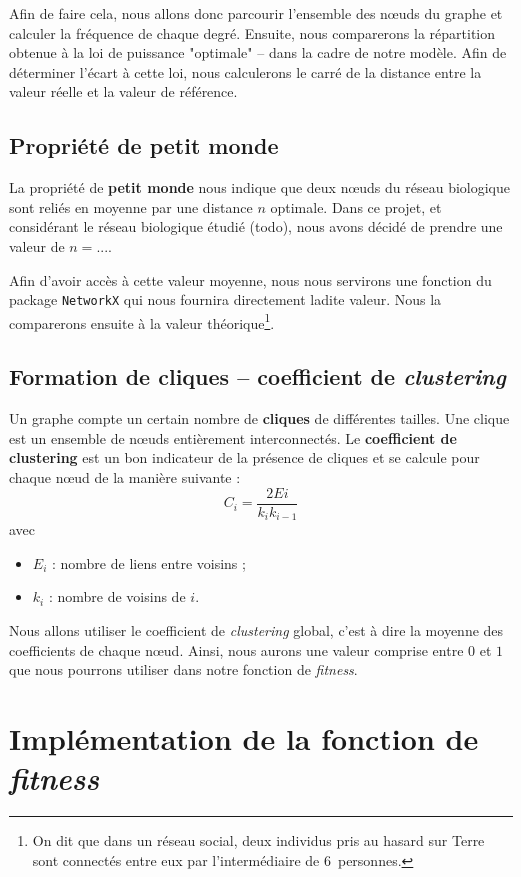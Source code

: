 Afin de faire cela, nous allons donc parcourir l'ensemble des nœuds du graphe et calculer la fréquence de chaque degré. Ensuite, nous comparerons la répartition obtenue à la loi de puissance "optimale" -- dans la cadre de notre modèle. Afin de déterminer l'écart à cette loi, nous calculerons le carré de la distance entre la valeur réelle et la valeur de référence.

\subsection{Propriété de petit monde}
La propriété de \textbf{petit monde} nous indique que deux nœuds du réseau biologique sont reliés en moyenne par une distance $n$ optimale. Dans ce projet, et considérant le réseau biologique étudié (todo), nous avons décidé de prendre une valeur de $n=...$.

Afin d'avoir accès à cette valeur moyenne, nous nous servirons une fonction du package \verb?NetworkX? qui nous fournira directement ladite valeur. Nous la comparerons ensuite à la valeur théorique\footnote{On dit que dans un réseau social, deux individus pris au hasard sur Terre sont connectés entre eux par l'intermédiaire de $6$~personnes.}.

\subsection{Formation de cliques -- coefficient de \textit{clustering}}
Un graphe compte un certain nombre de \textbf{cliques} de différentes tailles. Une clique est un ensemble de nœuds entièrement interconnectés. Le \textbf{coefficient de clustering} est un bon indicateur de la présence de cliques et se calcule pour chaque nœud de la manière suivante :
$$ C_i = \frac{2Ei}{k_i k_{i-1}} $$
avec
\begin{itemize}
 \item $E_i$ : nombre de liens entre voisins ;
 \item $k_i$ : nombre de voisins de $i$.
\end{itemize}
Nous allons utiliser le coefficient de \textit{clustering} global, c'est à dire la moyenne des coefficients de chaque nœud. Ainsi, nous aurons une valeur comprise entre $0$ et $1$ que nous pourrons utiliser dans notre fonction de \textit{fitness}.


\section{Implémentation de la fonction de \textit{fitness}}


